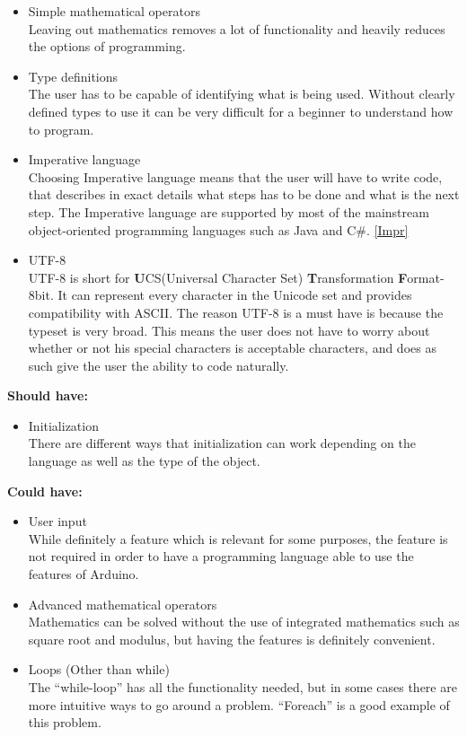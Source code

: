 \begin{itemize}
\item Simple mathematical operators \\
Leaving out mathematics removes a lot of functionality and heavily reduces the options of programming. \\

\item Type definitions \\
The user has to be capable of identifying what is being used. Without clearly defined types to use it can be very difficult for a beginner to understand how to program. \\

\item Imperative language \\
Choosing Imperative language means that the user will have to write code, that describes in exact details what steps has to be done and what is the next step. The Imperative language are supported by most of the mainstream object-oriented programming languages such as Java and C\#. \ref{Impr}

\item UTF-8 \\
UTF-8 is short for \textbf{U}CS(Universal Character Set) \textbf{T}ransformation \textbf{F}ormat-8bit. It can represent every character in the Unicode set and provides compatibility with ASCII. 
The reason UTF-8 is a must have is because the typeset is very broad. This means the user does not have to worry about whether or not his special characters is acceptable characters, and does as such give the user the ability to code naturally.\\
\end{itemize}

\textbf{Should have:}
\begin{itemize}
\item Initialization \\
There are different ways that initialization can work depending on the language as well as the type of the object. \\
\end{itemize}

\textbf{Could have:}
\begin{itemize}
\item User input \\
While definitely a feature which is relevant for some purposes, the feature is not required in order to have a programming language able to use the features of Arduino. \\

\item Advanced mathematical operators \\
Mathematics can be solved without the use of integrated mathematics such as square root and modulus, but having the features is definitely convenient. \\

\item Loops (Other than while) \\
The ``while-loop'' has all the functionality needed, but in some cases there are more intuitive ways to go around a problem. ``Foreach'' is a good example of this problem.\\
\end{itemize}